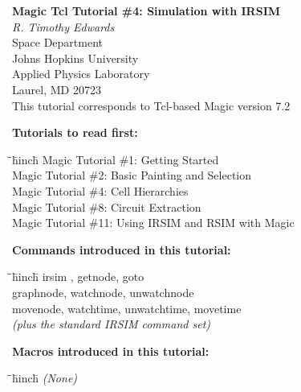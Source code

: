 \documentclass[letterpaper,twoside,12pt]{article}
\def\hinch{\hspace*{0.5in}}
\def\starti{\begin{center}\begin{tabbing}\hinch\=\hinch\=\hinch\=hinch\hinch\=\kill}
\def\endi{\end{tabbing}\end{center}}
\def\mytitle{Magic Tcl Tutorial \#4: Simulation with IRSIM}
\begin{document}
\makeatletter
\newcommand{\ps@magic}{%
	\renewcommand{\@oddhead}{\mytitle\hfil\today}%
	\renewcommand{\@evenhead}{\today\hfil\mytitle}%
	\renewcommand{\@evenfoot}{\hfil\textrm{--{\thepage}--}\hfil}%
	\renewcommand{\@oddfoot}{\@evenfoot}}
\newcommand{\ps@mplain}{%
	\renewcommand{\@oddhead}{}%
	\renewcommand{\@evenhead}{}%
	\renewcommand{\@evenfoot}{\hfil\textrm{--{\thepage}--}\hfil}%
	\renewcommand{\@oddfoot}{\@evenfoot}}
\makeatother
\pagestyle{magic}
\thispagestyle{mplain}


\begin{center}
  {\bfseries \Large \mytitle} \\
  \vspace*{0.5in}
  {\itshape R. Timothy Edwards} \\
  \vspace*{0.5in}
   Space Department \\
   Johns Hopkins University \\
   Applied Physics Laboratory \\
   Laurel, MD  20723 \\
  \vspace*{0.25in}
  This tutorial corresponds to Tcl-based Magic version 7.2 \\
\end{center}
\vspace*{0.5in}

{\noindent\bfseries\large Tutorials to read first:}
\starti
   \> Magic Tutorial \#1: Getting Started \\
   \> Magic Tutorial \#2: Basic Painting and Selection \\
   \> Magic Tutorial \#4: Cell Hierarchies \\
   \> Magic Tutorial \#8: Circuit Extraction \\
   \> Magic Tutorial \#11: Using IRSIM and RSIM with Magic
\endi

{\noindent\bfseries\large Commands introduced in this tutorial:}
\starti
   \> irsim , getnode, goto \\
   \> graphnode, watchnode, unwatchnode \\
   \> movenode, watchtime, unwatchtime, movetime \\
   \> {\itshape (plus the standard IRSIM command set)}
\endi

{\noindent\bfseries\large Macros introduced in this tutorial:}

\starti
   \> {\itshape (None)}
\endi

\vspace*{0.25in}
\end{document}

